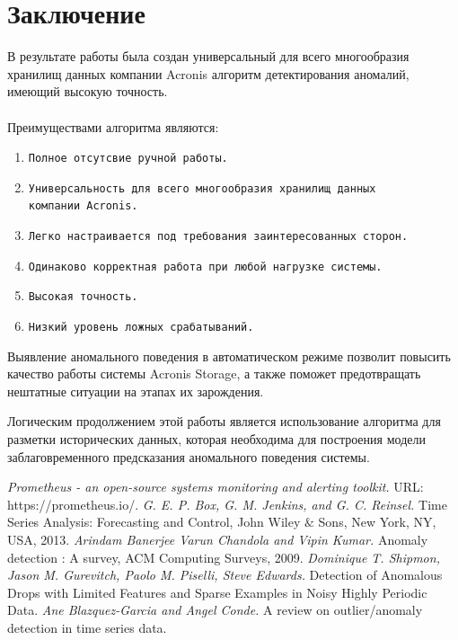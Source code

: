 \documentclass[14pt, a4paper]{extarticle}
\begin{document}
	\section{Заключение}	
	В результате работы была создан универсальный для всего  многообразия хранилищ данных компании Acronis алгоритм детектирования аномалий, имеющий высокую точность.
	\\\\
	 Преимуществами алгоритма являются: 
	  \begin{enumerate}
	 	\item \texttt{Полное отсутсвие ручной работы.}
	 	\item \texttt{Универсальность для всего многообразия хранилищ данных \\компании Acronis.}
	 	\item \texttt{Легко настраивается под требования заинтересованных сторон.}
	 	\item \texttt{Одинаково корректная работа при любой нагрузке системы.}
	 	\item \texttt{Высокая точность.}
		\item \texttt{Низкий уровень ложных срабатываний.}
\end{enumerate}

	 Выявление аномального поведения в автоматическом режиме позволит повысить  качество работы системы Acronis Storage, а также поможет предотвращать нештатные ситуации на этапах их зарождения. 
	
	Логическим продолжением этой работы является использование алгоритма для разметки исторических данных, которая необходима для построения  модели заблаговременного предсказания аномального поведения системы. 
	
	
	
	
	
	\newpage
	\begin{thebibliography}{228}
		\emph{Prometheus - an open-source systems monitoring and alerting toolkit.} 
		URL: https://prometheus.io/.
		\emph{G. E. P. Box, G. M. Jenkins, and G. C. Reinsel.} 
		Time Series Analysis: Forecasting and Control, John Wiley $\&$ Sons, New York, NY, USA, 2013.
		\emph{Arindam Banerjee Varun Chandola and Vipin Kumar.} 
		Anomaly detection : A survey, ACM Computing Surveys, 2009. 
		\emph{Dominique T. Shipmon, Jason M. Gurevitch, Paolo M. Piselli, Steve Edwards.} 
		Detection of Anomalous Drops with Limited Features and Sparse Examples in Noisy Highly Periodic Data. 
		\emph{Ane Blazquez-Garcia and Angel Conde.} 
		A review on outlier/anomaly detection in time series data.
	\end{thebibliography}
			
\end{document}
